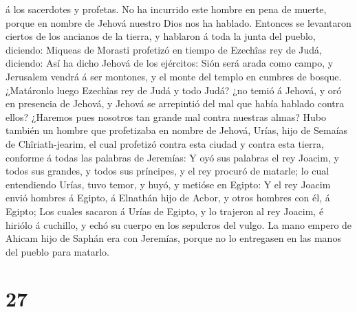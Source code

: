 á los sacerdotes y profetas. No ha incurrido este hombre en pena de
muerte, porque en nombre de Jehová nuestro Dios nos ha hablado.
 Entonces se levantaron ciertos de los ancianos de la
tierra, y hablaron á toda la junta del pueblo, diciendo: 
Miqueas de Morasti profetizó en tiempo de Ezechîas rey de Judá,
diciendo: Así ha dicho Jehová de los ejércitos: Sión será arada como
campo, y Jerusalem vendrá á ser montones, y el monte del templo en
cumbres de bosque.  ¿Matáronlo luego Ezechîas rey de Judá
y todo Judá? ¿no temió á Jehová, y oró en presencia de Jehová, y Jehová
se arrepintió del mal que había hablado contra ellos? ¿Haremos pues
nosotros tan grande mal contra nuestras almas?  Hubo
también un hombre que profetizaba en nombre de Jehová, Urías, hijo de
Semaías de Chîriath-jearim, el cual profetizó contra esta ciudad y
contra esta tierra, conforme á todas las palabras de Jeremías:
 Y oyó sus palabras el rey Joacim, y todos sus grandes, y
todos sus príncipes, y el rey procuró de matarle; lo cual entendiendo
Urías, tuvo temor, y huyó, y metióse en Egipto:  Y el rey
Joacim envió hombres á Egipto, á Elnathán hijo de Acbor, y otros hombres
con él, á Egipto;  Los cuales sacaron á Urías de Egipto,
y lo trajeron al rey Joacim, é hiriólo á cuchillo, y echó su cuerpo en
los sepulcros del vulgo.  La mano empero de Ahicam hijo
de Saphán era con Jeremías, porque no lo entregasen en las manos del
pueblo para matarlo.

\hypertarget{section-26}{%
\section{27}\label{section-26}}

